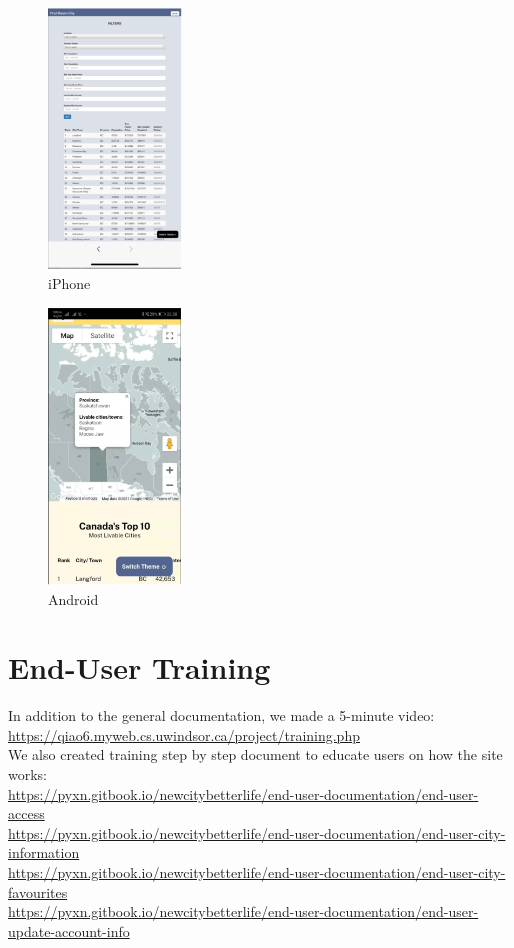 \documentclass[12pt, letterpaper]{article}
\begin{document}
 \newpage
 
 \begin{figure}[htbp]
	\centering
	\includegraphics[width=1.4in]{images/q12-iphone.png}
	\caption{iPhone}
 \end{figure}
 
 \begin{figure}[htbp]
	\centering
	\includegraphics[width=1.4in]{images/q12-android.png}
	\caption{Android}
 \end{figure}
 
 \newpage


\section{End-User Training}
In addition to the general documentation, we made a 5-minute video:
\\\url{https://qiao6.myweb.cs.uwindsor.ca/project/training.php}
\\We also created training step by step document to educate users on how the site works: 
\\\url{https://pyxn.gitbook.io/newcitybetterlife/end-user-documentation/end-user-access}
\\\url{https://pyxn.gitbook.io/newcitybetterlife/end-user-documentation/end-user-city-information}
\\\url{https://pyxn.gitbook.io/newcitybetterlife/end-user-documentation/end-user-city-favourites}
\\\url{https://pyxn.gitbook.io/newcitybetterlife/end-user-documentation/end-user-update-account-info}
\end{document}
